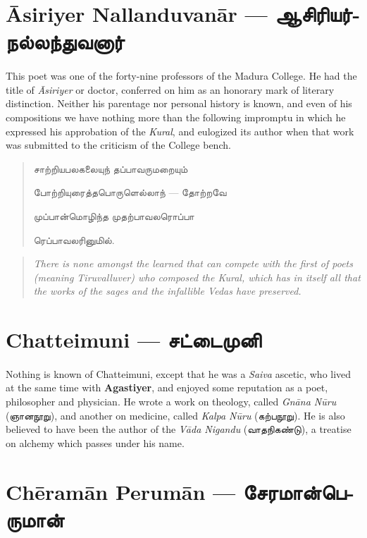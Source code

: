 \documentclass{article}
\newcommand{\TamilText}[1]{\texttamil{#1}}
\newcommand{\TamilBold}[1]{\texttamil{\textbf{#1}}}
\newcommand{\tam}[1]{\TamilText{#1}}
\newcommand{\tambold}[1]{\TamilBold{#1}}
\begin{document}
\section{\={A}siriyer Nallanduvan\={a}r --- \tambold{ஆசிரியர்நல்லந்துவனார்}}
\paragraph{}
This poet was one of the forty-nine professors of the Madura College. He had the title of \emph{\={A}siriyer} or doctor, conferred on him as an honorary mark of literary distinction. Neither his parentage nor personal history is known, and even of his compositions we have nothing more than the following impromptu in which he expressed his approbation of the \emph{Kural}, and eulogized its author when that work was submitted to the criticism of the College bench.
\begin{quotation}\small
\tam{சாற்றியபலகலையுந் தப்பாவருமறையும்‌}

\tam{போற்றியுரைத்தபொருளெல்லாந்} --- \tam{தோற்றவே}

\tam{முப்பான்மொழிந்த முதற்பாவலரொப்பா}

\tam{ரெப்பாவலரினுமில்‌}.
\end{quotation}
\begin{quotation}\small
\emph{There is none amongst the learned that can compete with the first of poets (meaning Tiruvalluver) who composed the Kural, which has in itself all that the works of the sages and the infallible Vedas have preserved.}
\end{quotation}

\section{Chatteimuni --- \tambold{சட்டைமுனி}}
\paragraph{}
Nothing is known of Chatteimuni, except that he was a \emph{Saiva} ascetic, who lived at the same time with \textbf{Agastiyer}, and enjoyed some reputation as a poet, philosopher and physician. He wrote a work on theology, called \emph{Gn\={a}na N\={u}ru} (\tam{ஞானநூறு}), and another on medicine, called \emph{Kalpa N\={u}ru} (\tam{கற்பநூறு}). He is also believed to have been the author of the \emph{V\={a}da Nigandu} (\tam{வாதநிகண்டு}), a treatise on alchemy which passes under his name.

\section{Ch\={e}ram\={a}n Perum\={a}n --- \tambold{சேரமான்பெருமான்}}
\end{document}
